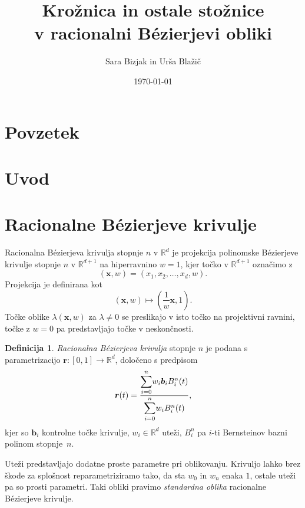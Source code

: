 \documentclass[a4paper,11pt]{article}
\title{Krožnica in ostale stožnice \\
v racionalni B\'ezierjevi obliki
}
\author{Sara Bizjak in Urša Blažič}
\date{\today}
\theoremstyle{definition}
\newtheorem*{definicija}{Definicija}
\theoremstyle{plain}
\begin{document}
\maketitle

\section{Povzetek}

\section{Uvod}

\section{Racionalne B\'ezierjeve krivulje}

Racionalna B\'ezierjeva krivulja stopnje $n$ v $\mathbb{R}^d$ je projekcija polinomske B\'ezierjeve krivulje stopnje $n$ v $\mathbb{R}^{d+1}$ na hiperravnino $w=1$, kjer točko v  $\mathbb{R}^{d+1}$  označimo z
$$(\boldsymbol{x},w)=(x_1,x_2,\dots,x_d,w).$$
Projekcija je definirana kot
$$(\boldsymbol{x},w)\mapsto (\frac{1}{w}\boldsymbol{x},1).$$
Točke oblike $\lambda(\boldsymbol{x}, w)$ za $\lambda\neq 0$ se preslikajo v isto točko na projektivni ravnini, točke z
$w = 0$ pa predstavljajo točke v neskončnosti.

\begin{definicija}
\emph{Racionalna B\'ezierjeva krivulja} stopnje $n$ je podana s parametrizacijo $\boldsymbol{r}:[0,1]\rightarrow \mathbb{R}^d$, določeno s predpisom
$$\boldsymbol{r}(t)=\frac{\mathlarger{\sum}_{i=0}^n w_i\boldsymbol{b}_iB_i^n(t)}{\mathlarger{\sum}_{i=0}^n w_iB_i^n(t)},$$
kjer so $\boldsymbol{b}_i$ kontrolne točke krivulje, $w_i\in\mathbb{R}^d$ uteži, $B_i^n$ pa $i$-ti Bernsteinov bazni polinom stopnje~$n$.
\end{definicija}

Uteži predstavljajo dodatne proste parametre pri oblikovanju. Krivuljo lahko brez škode za splošnost reparametriziramo tako, da sta $w_0$ in $w_n$ enaka $1$, ostale uteži pa so prosti parametri. Taki obliki pravimo \emph{standardna oblika} racionalne B\'ezierjeve krivulje.
\end{document}
